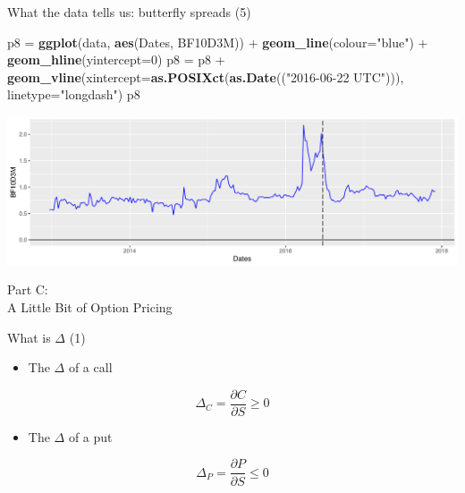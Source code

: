\documentclass[ignorenonframetext,aspectratio=169]{beamer}
\newenvironment{Shaded}{}{}
\newcommand{\KeywordTok}[1]{\textcolor[rgb]{0.00,0.44,0.13}{\textbf{#1}}}
\newcommand{\DataTypeTok}[1]{\textcolor[rgb]{0.56,0.13,0.00}{#1}}
\newcommand{\DecValTok}[1]{\textcolor[rgb]{0.25,0.63,0.44}{#1}}
\newcommand{\StringTok}[1]{\textcolor[rgb]{0.25,0.44,0.63}{#1}}
\newcommand{\OperatorTok}[1]{\textcolor[rgb]{0.40,0.40,0.40}{#1}}
\newcommand{\NormalTok}[1]{#1}
\providecommand{\tightlist}{%
  \setlength{\itemsep}{0pt}\setlength{\parskip}{0pt}}
\begin{document}
\begin{frame}[fragile]{What the data tells us: butterfly spreads (5)}

\begin{Shaded}
\begin{Highlighting}[]
\NormalTok{p8 =}\StringTok{ }\KeywordTok{ggplot}\NormalTok{(data, }\KeywordTok{aes}\NormalTok{(Dates, BF10D3M)) }\OperatorTok{+}\StringTok{ }\KeywordTok{geom_line}\NormalTok{(}\DataTypeTok{colour=}\StringTok{"blue"}\NormalTok{) }\OperatorTok{+}\StringTok{ }
\StringTok{        }\KeywordTok{geom_hline}\NormalTok{(}\DataTypeTok{yintercept=}\DecValTok{0}\NormalTok{)}
\NormalTok{p8 =}\StringTok{ }\NormalTok{p8 }\OperatorTok{+}\StringTok{ }\KeywordTok{geom_vline}\NormalTok{(}\DataTypeTok{xintercept=}\KeywordTok{as.POSIXct}\NormalTok{(}\KeywordTok{as.Date}\NormalTok{((}\StringTok{"2016-06-22 UTC"}\NormalTok{))),}
                     \DataTypeTok{linetype=}\StringTok{"longdash"}\NormalTok{)}
\NormalTok{p8}
\end{Highlighting}
\end{Shaded}

\begin{center}\includegraphics[width=1\linewidth]{2018_02_07_IMF_FXCourse_files/figure-beamer/unnamed-chunk-19-1} \end{center}

\end{frame}

\begin{frame}{}

\color{blue} \LARGE{Part C:}\\
\LARGE{A Little Bit of Option Pricing}

\end{frame}

\begin{frame}{What is \(\Delta\) (1)}

\begin{itemize}
\tightlist
\item
  The \(\Delta\) of a call
\end{itemize}

\[ \Delta_C = \frac{\partial C}{\partial S} \geq 0\]

\begin{itemize}
\tightlist
\item
  The \(\Delta\) of a put
\end{itemize}

\[ \Delta_P = \frac{\partial P}{\partial S} \leq 0\]

\end{frame}
\end{document}
